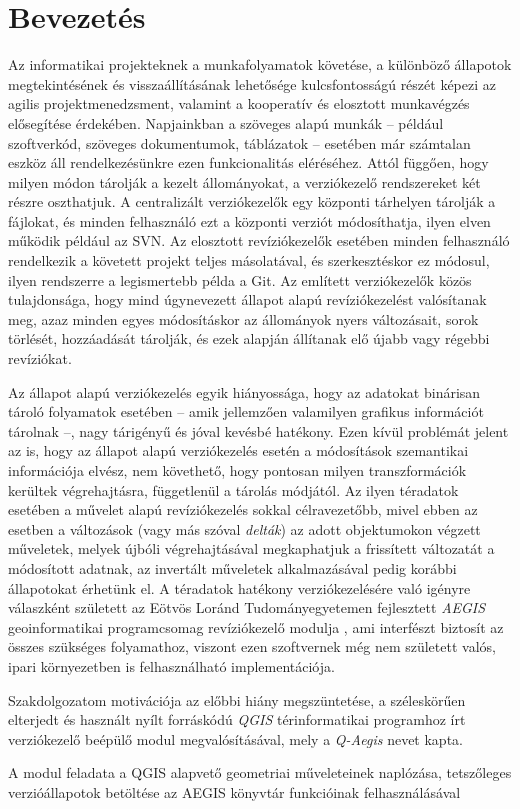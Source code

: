 \chapter{Bevezetés}
\label{ch:intro}

Az informatikai projekteknek a munkafolyamatok követése, a különböző állapotok megtekintésének és visszaállításának lehetősége kulcsfontosságú részét képezi az agilis projektmenedzsment, valamint a kooperatív és elosztott munkavégzés elősegítése érdekében. Napjainkban a szöveges alapú munkák -- például szoftverkód, szöveges dokumentumok, táblázatok -- esetében már számtalan eszköz áll rendelkezésünkre ezen funkcionalitás eléréséhez. Attól függően, hogy milyen módon tárolják a kezelt állományokat, a verziókezelő rendszereket két részre oszthatjuk. A centralizált verziókezelők egy központi tárhelyen tárolják a fájlokat, és minden felhasználó ezt a központi verziót módosíthatja, ilyen elven működik például az SVN. Az elosztott revíziókezelők esetében minden felhasználó rendelkezik a követett projekt teljes másolatával, és szerkesztéskor ez módosul, ilyen rendszerre a legismertebb példa a Git.
Az említett verziókezelők közös tulajdonsága, hogy mind úgynevezett állapot alapú revíziókezelést valósítanak meg, azaz minden egyes módosításkor az állományok nyers változásait, sorok törlését, hozzáadását tárolják, és ezek alapján állítanak elő újabb vagy régebbi revíziókat.

Az állapot alapú verziókezelés egyik hiányossága, hogy az adatokat binárisan tároló folyamatok esetében -- amik jellemzően valamilyen grafikus információt tárolnak --, nagy tárigényű és jóval kevésbé hatékony. Ezen kívül problémát jelent az is, hogy az állapot alapú verziókezelés esetén a módosítások szemantikai információja elvész, nem követhető, hogy pontosan milyen transzformációk kerültek végrehajtásra, függetlenül a tárolás módjától.
Az ilyen téradatok esetében a művelet alapú revíziókezelés sokkal célravezetőbb, mivel ebben az esetben a változások (vagy más szóval \emph{delták}) az adott objektumokon végzett műveletek, melyek újbóli végrehajtásával megkaphatjuk a frissített változatát a módosított adatnak, az invertált műveletek alkalmazásával pedig korábbi állapotokat érhetünk el.
A téradatok hatékony verziókezelésére való igényre válaszként született az Eötvös Loránd Tudományegyetemen fejlesztett \emph{AEGIS} geoinformatikai programcsomag \cite{giachetta2013aegis, aegis} revíziókezelő modulja \cite{cserep2013versioning,cserep2015operation}, ami interfészt biztosít az összes szükséges folyamathoz, viszont ezen szoftvernek még nem született valós, ipari környezetben is felhasználható implementációja.

Szakdolgozatom motivációja az előbbi hiány megszüntetése, a széleskörűen elterjedt és használt nyílt forráskódú \emph{QGIS} térinformatikai programhoz \cite{qgis} írt verziókezelő beépülő modul megvalósításával, mely a \emph{Q-Aegis} nevet kapta.

A modul feladata a QGIS alapvető geometriai műveleteinek naplózása, tetszőleges verzióállapotok betöltése az AEGIS könyvtár funkcióinak felhasználásával

